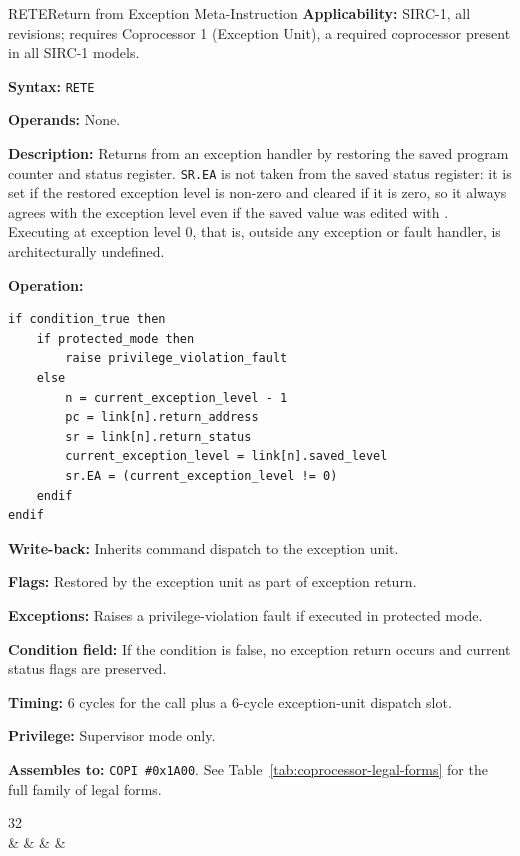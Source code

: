 \begin{instructionbox}{RETE}{Return from Exception Meta-Instruction}
	\textbf{Applicability:} SIRC-1, all revisions; requires Coprocessor 1 (Exception Unit), a required coprocessor
	present in all SIRC-1 models.

	\textbf{Syntax:} \texttt{RETE}

	\textbf{Operands:} None.

	\textbf{Description:} Returns from an exception handler by restoring the saved program counter and status register.
	\texttt{SR.EA} is not taken from the saved status register: it is set if the restored exception level is non-zero
	and cleared if it is zero, so it always agrees with the exception level even if the saved value was edited with
	. Executing  at exception level 0, that is, outside any exception or fault handler, is architecturally
	undefined.

	\textbf{Operation:}
	\begin{verbatim}
if condition_true then
    if protected_mode then
        raise privilege_violation_fault
    else
        n = current_exception_level - 1
        pc = link[n].return_address
        sr = link[n].return_status
        current_exception_level = link[n].saved_level
        sr.EA = (current_exception_level != 0)
    endif
endif
\end{verbatim}

	\textbf{Write-back:} Inherits  command dispatch to the exception unit.

	\textbf{Flags:} Restored by the exception unit as part of exception return.

	\textbf{Exceptions:} Raises a privilege-violation fault if executed in protected mode.

	\textbf{Condition field:} If the condition is false, no exception return occurs and current status flags are
	preserved.

	\textbf{Timing:} 6 cycles for the call plus a 6-cycle exception-unit dispatch slot.

	\textbf{Privilege:} Supervisor mode only.

	\textbf{Assembles to:} \texttt{COPI \#0x1A00}. See Table~\ref{tab:coprocessor-legal-forms} for the full family of legal forms.

	\begin{center}
		\begin{bytefield}[bitwidth=1.1em]{32}
			 \\
			 &
			 &
			 &
			 &
		\end{bytefield}
	\end{center}


\end{instructionbox}
